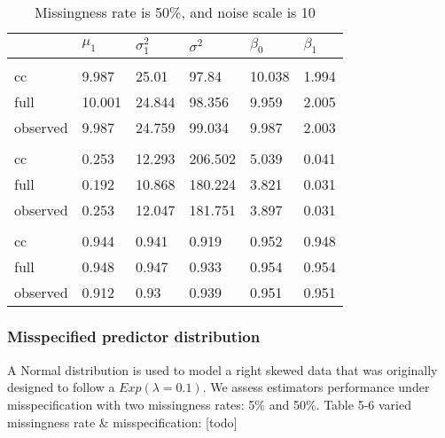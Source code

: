 \documentclass[
  twocolumn]{article}
\begin{document}
\begin{table}[h]
\caption{Missingness rate is 50\%, and noise scale is 10}
\begingroup\fontsize{7}{9}\selectfont

\begin{tabu} to 
\toprule
 & $\mu_1$ & $\sigma^2_1$ & $\sigma^2$ & $\beta_0$ & $\beta_1$\\
\midrule
\addlinespace[0.3em]
\\
\hspace{1em}cc & 9.987 & 25.01 & 97.84 & 10.038 & 1.994\\
\hspace{1em}full & 10.001 & 24.844 & 98.356 & 9.959 & 2.005\\
\hspace{1em}observed & 9.987 & 24.759 & 99.034 & 9.987 & 2.003\\
\addlinespace[0.3em]
\\
\hspace{1em}cc & 0.253 & 12.293 & 206.502 & 5.039 & 0.041\\
\hspace{1em}full & 0.192 & 10.868 & 180.224 & 3.821 & 0.031\\
\hspace{1em}observed & 0.253 & 12.047 & 181.751 & 3.897 & 0.031\\
\addlinespace[0.3em]
\\
\hspace{1em}cc & 0.944 & 0.941 & 0.919 & 0.952 & 0.948\\
\hspace{1em}full & 0.948 & 0.947 & 0.933 & 0.954 & 0.954\\
\hspace{1em}observed & 0.912 & 0.93 & 0.939 & 0.951 & 0.951\\
\bottomrule
\end{tabu}
\endgroup{}
\end{table}

\hypertarget{misspecified-predictor-distribution}{%
\subsubsection{Misspecified predictor
distribution}\label{misspecified-predictor-distribution}}

A Normal distribution is used to model a right skewed data that was
originally designed to follow a \(Exp(\lambda = 0.1)\). We assess
estimators performance under misspecification with two missingness
rates: 5\% and 50\%. Table 5-6 varied missingness rate \&
misspecification: {[}todo{]}
\end{document}
